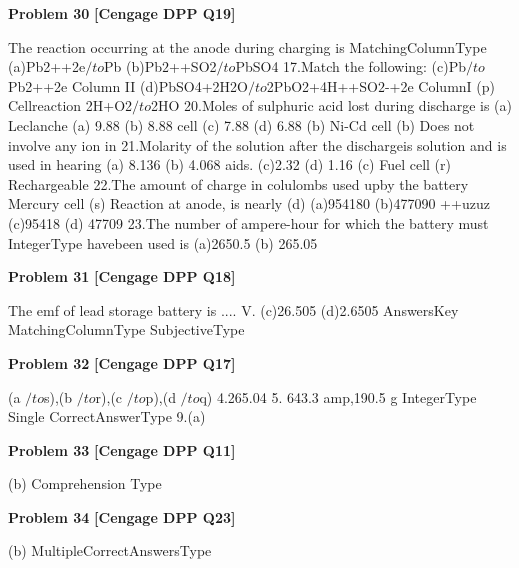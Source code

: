 \begin{problembox}
\textbf{Problem 30} \hfill \textbf{[Cengage DPP Q19]}
\label{q:ext-cng_dpp_all_questions-30}

The reaction occurring at the anode during charging is
MatchingColumnType
(a)Pb2++2e$/to$Pb
(b)Pb$2$++SO2$/to$PbSO4
17.Match the following:
(c)Pb$/to$Pb2++2e
Column II
(d)PbSO4+2H2O$/to$2PbO2+4H++SO$2$-+2e
ColumnI
(p)
Cellreaction 2H+O2$/to$2HO
20.Moles of sulphuric acid lost during discharge is
(a)
Leclanche
(a) 9.88
(b) 8.88
cell
(c) 7.88
(d) 6.88
(b)
Ni-Cd cell
(b)
Does not involve any ion in
21.Molarity of the solution after the dischargeis
solution and is used in hearing
(a) 8.136
(b) 4.068
aids.
(c)2.32
(d) 1.16
(c)
Fuel cell
(r)
Rechargeable
22.The amount of charge in colulombs used upby the battery
Mercury cell
(s)
Reaction at anode,
is nearly
(d)
(a)954180
(b)477090
++uzuz
(c)95418
(d) 47709
23.The number of ampere-hour for which the battery must
IntegerType
havebeen used is
(a)2650.5
(b) 265.05
\end{problembox}

\begin{problembox}
\textbf{Problem 31} \hfill \textbf{[Cengage DPP Q18]}
\label{q:ext-cng_dpp_all_questions-31}

The emf of lead storage battery is .... V.
(c)26.505
(d)2.6505
AnswersKey
MatchingColumnType
SubjectiveType
\end{problembox}

\begin{problembox}
\textbf{Problem 32} \hfill \textbf{[Cengage DPP Q17]}
\label{q:ext-cng_dpp_all_questions-32}

(a $/to$s),(b $/to$r),(c $/to$p),(d $/to$q)
4.265.04 5. 643.3 amp,190.5 g
IntegerType
Single CorrectAnswerType
9.(a)
\end{problembox}

\begin{problembox}
\textbf{Problem 33} \hfill \textbf{[Cengage DPP Q11]}
\label{q:ext-cng_dpp_all_questions-33}

(b)
Comprehension Type
\end{problembox}

\begin{problembox}
\textbf{Problem 34} \hfill \textbf{[Cengage DPP Q23]}
\label{q:ext-cng_dpp_all_questions-34}

(b)
MultipleCorrectAnswersType
\end{problembox}


